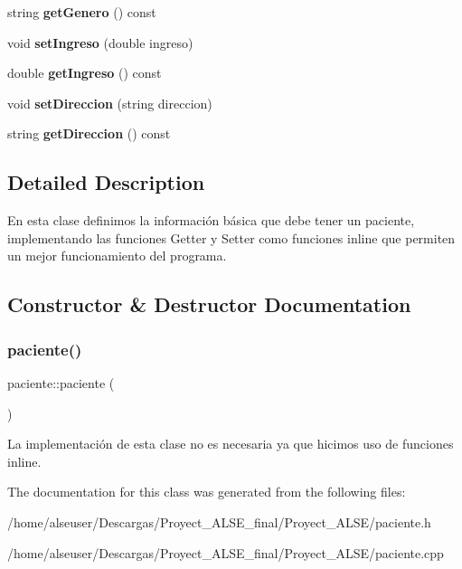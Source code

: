 \begin{DoxyCompactItemize}
string {\bfseries get\+Genero} () const
\item 
\mbox{\label{classpaciente_a4ce7ba7647d1d12bac4620385b256cad}} 
void {\bfseries set\+Ingreso} (double ingreso)
\item 
\mbox{\label{classpaciente_a0446f2e504093bbce1a6e80a21a6b986}} 
double {\bfseries get\+Ingreso} () const
\item 
\mbox{\label{classpaciente_a6d93e288ff755fc5bd1c433b9f3f6de2}} 
void {\bfseries set\+Direccion} (string direccion)
\item 
\mbox{\label{classpaciente_a66e228c19e21057d1d683e2c44f1ff88}} 
string {\bfseries get\+Direccion} () const
\end{DoxyCompactItemize}


\subsection{Detailed Description}
En esta clase definimos la información básica que debe tener un paciente, implementando las funciones Getter y Setter como funciones inline que permiten un mejor funcionamiento del programa. 

\subsection{Constructor \& Destructor Documentation}
\mbox{\label{classpaciente_ac81d0605801b88c3b9e10d828730240d}} 
\subsubsection{\texorpdfstring{paciente()}{paciente()}}
{\footnotesize\ttfamily paciente\+::paciente (\begin{DoxyParamCaption}{ }\end{DoxyParamCaption})}

La implementación de esta clase no es necesaria ya que hicimos uso de funciones inline. 

The documentation for this class was generated from the following files\+:\begin{DoxyCompactItemize}
\item 
/home/alseuser/\+Descargas/\+Proyect\+\_\+\+A\+L\+S\+E\+\_\+final/\+Proyect\+\_\+\+A\+L\+S\+E/paciente.\+h\item 
/home/alseuser/\+Descargas/\+Proyect\+\_\+\+A\+L\+S\+E\+\_\+final/\+Proyect\+\_\+\+A\+L\+S\+E/paciente.\+cpp\end{DoxyCompactItemize}
